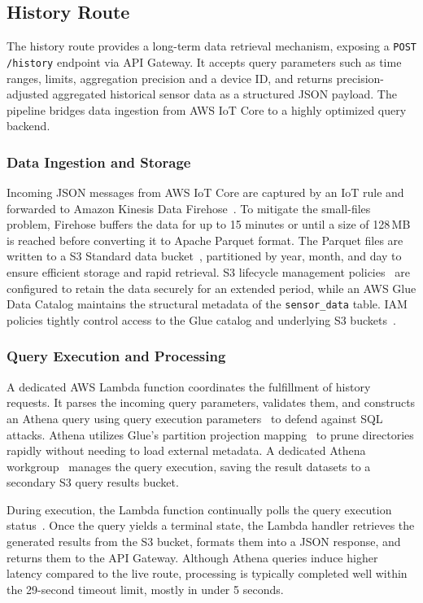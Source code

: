 \subsection{History Route}\label{sec:history_route}
The history route provides a long-term data retrieval mechanism, exposing a
\texttt{POST /history} endpoint via API Gateway. It accepts query parameters
such as time ranges, limits, aggregation precision and a device ID, and returns
precision-adjusted aggregated historical sensor data as a structured JSON payload.
The pipeline bridges data ingestion from AWS IoT Core to a highly optimized query backend.

\subsubsection{Data Ingestion and Storage}
Incoming JSON messages from AWS IoT Core are captured by an IoT rule and
forwarded to Amazon Kinesis Data Firehose~\cite{aws-firehose}. To mitigate
the small-files problem, Firehose buffers the data for up to 15 minutes or
until a size of 128\,MB is reached before converting it to Apache Parquet
format. The Parquet files are written to a S3 Standard data
bucket~\cite{aws-s3-storage-classes},
partitioned by year, month, and day to ensure efficient storage and rapid
retrieval. S3 lifecycle management policies~\cite{aws-s3-lifecycle-management}
are configured to retain the data securely for an extended period, while an
AWS Glue Data Catalog maintains the structural metadata of the
\texttt{sensor\_data} table. IAM policies tightly control access to the Glue
catalog and underlying S3 buckets~\cite{aws-athena-iam-policies}.

\subsubsection{Query Execution and Processing}

A dedicated AWS Lambda function coordinates the fulfillment of history
requests. It parses the incoming query parameters, validates them, and
constructs an Athena query using query execution
parameters~\cite{aws-athena-execution-parameters} to defend against SQL attacks.
Athena utilizes Glue's partition projection
mapping~\cite{aws-athena-partition-projection} to prune directories rapidly
without needing to load external metadata. A dedicated Athena
workgroup~\cite{aws-athena-workgroups} manages the query execution, saving the
result datasets to a secondary S3 query results bucket.

During execution, the Lambda function continually polls the query execution
status~\cite{aws-athena-query-execution-status}. Once the query yields a
terminal state, the Lambda handler retrieves the generated results from the
S3 bucket, formats them into a JSON response, and returns them to the API
Gateway. Although Athena queries induce higher latency compared to the live
route, processing is typically completed well within the 29-second timeout limit,
mostly in under 5 seconds.